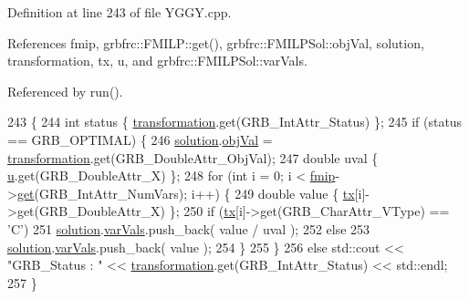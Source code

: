 Definition at line 243 of file Y\+G\+G\+Y.\+cpp.



References fmip, grbfrc\+::\+F\+M\+I\+L\+P\+::get(), grbfrc\+::\+F\+M\+I\+L\+P\+Sol\+::obj\+Val, solution, transformation, tx, u, and grbfrc\+::\+F\+M\+I\+L\+P\+Sol\+::var\+Vals.



Referenced by run().


\begin{DoxyCode}
243                                  \{
244     \textcolor{keywordtype}{int} status \{ \hyperlink{classgrbfrc_1_1YGGY_a6f528d327b9dfbe474d357afe8a3d518}{transformation}.get(GRB\_IntAttr\_Status) \};
245     \textcolor{keywordflow}{if} (status == GRB\_OPTIMAL) \{
246       \hyperlink{classgrbfrc_1_1YGGY_a26d38a8358290866b02c11a09ddd5b4e}{solution}.\hyperlink{structgrbfrc_1_1FMILPSol_a63fec0e4c5df880215f3de25e8605505}{objVal} = \hyperlink{classgrbfrc_1_1YGGY_a6f528d327b9dfbe474d357afe8a3d518}{transformation}.get(GRB\_DoubleAttr\_ObjVal);
247       \textcolor{keywordtype}{double} uval \{ \hyperlink{classgrbfrc_1_1YGGY_a1c24782afe02686a8eabc59b829cdec0}{u}.get(GRB\_DoubleAttr\_X) \};
248       \textcolor{keywordflow}{for} (\textcolor{keywordtype}{int} i = 0; i < \hyperlink{classgrbfrc_1_1YGGY_aa4f63c22c95cd48cd87756ebc5de53aa}{fmip}->\hyperlink{classgrbfrc_1_1FMILP_a5f74659534b60535f4cacce86ac94c23}{get}(GRB\_IntAttr\_NumVars); i++) \{
249         \textcolor{keywordtype}{double} value \{ \hyperlink{classgrbfrc_1_1YGGY_a1c58fb733dc53d1bf8823623aaf297f8}{tx}[i]->get(GRB\_DoubleAttr\_X) \};
250         \textcolor{keywordflow}{if} (\hyperlink{classgrbfrc_1_1YGGY_a1c58fb733dc53d1bf8823623aaf297f8}{tx}[i]->\textcolor{keyword}{get}(GRB\_CharAttr\_VType) == \textcolor{charliteral}{'C'})
251             \hyperlink{classgrbfrc_1_1YGGY_a26d38a8358290866b02c11a09ddd5b4e}{solution}.\hyperlink{structgrbfrc_1_1FMILPSol_a36afbb370bb174c488c46b882c0c9bbf}{varVals}.push\_back( value / uval );
252         \textcolor{keywordflow}{else}
253             \hyperlink{classgrbfrc_1_1YGGY_a26d38a8358290866b02c11a09ddd5b4e}{solution}.\hyperlink{structgrbfrc_1_1FMILPSol_a36afbb370bb174c488c46b882c0c9bbf}{varVals}.push\_back( value );
254       \}
255     \}
256     \textcolor{keywordflow}{else} std::cout << \textcolor{stringliteral}{"GRB\_Status : "} << \hyperlink{classgrbfrc_1_1YGGY_a6f528d327b9dfbe474d357afe8a3d518}{transformation}.get(GRB\_IntAttr\_Status) << std::endl;
257 \}
\end{DoxyCode}


